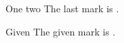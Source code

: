 \documentclass{article}
\begin{document}
One two
\setcounter{endnote}{17}
The last mark is \theenmark.

Given
\setcounter{endnote}{17}
The given mark is \theenmark.
\end{document}
